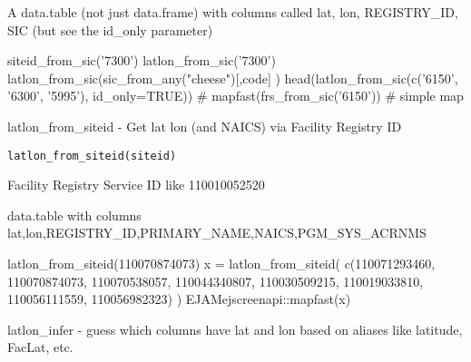 \documentclass[a4paper]{book}
\begin{document}
%
\begin{Value}
A data.table (not just data.frame) with columns called
lat, lon, REGISTRY\_ID, SIC (but see the id\_only parameter)
\end{Value}
%
\begin{Examples}
\begin{ExampleCode}
  siteid_from_sic('7300')
  latlon_from_sic('7300')
  latlon_from_sic(sic_from_any("cheese")[,code] )
  head(latlon_from_sic(c('6150', '6300', '5995'), id_only=TRUE))
  # mapfast(frs_from_sic('6150')) # simple map
\end{ExampleCode}
\end{Examples}
%
\begin{Description}\relax
latlon\_from\_siteid - Get lat lon (and NAICS) via Facility Registry ID
\end{Description}
%
\begin{Usage}
\begin{verbatim}
latlon_from_siteid(siteid)
\end{verbatim}
\end{Usage}
%
\begin{Arguments}
\begin{ldescription}
\item[\code{siteid}] Facility Registry Service ID like 110010052520
\end{ldescription}
\end{Arguments}
%
\begin{Value}
data.table with columns
lat,lon,REGISTRY\_ID,PRIMARY\_NAME,NAICS,PGM\_SYS\_ACRNMS
\end{Value}
%
\begin{Examples}
\begin{ExampleCode}
 latlon_from_siteid(110070874073)
x = latlon_from_siteid(
    c(110071293460, 110070874073, 110070538057, 110044340807,
       110030509215, 110019033810, 110056111559, 110056982323)
        )
EJAMejscreenapi::mapfast(x)
\end{ExampleCode}
\end{Examples}
%
\begin{Description}\relax
latlon\_infer - guess which columns have lat and lon based on aliases like latitude, FacLat, etc.
\end{Description}
\end{document}
